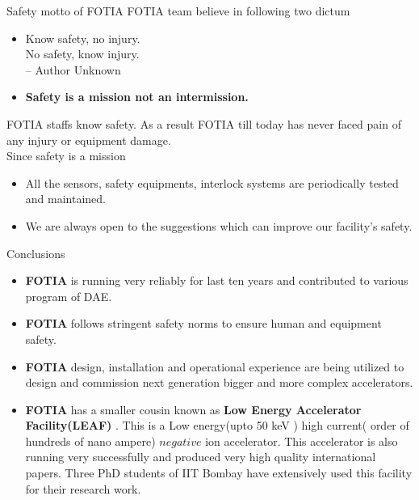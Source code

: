 \documentclass[11pt]{beamer}
\begin{document}
\begin{frame}{Safety motto of FOTIA}
FOTIA team believe in following two dictum
\begin{itemize}
\item Know safety, no injury.\\
     No safety, know injury. \\
      -- Author Unknown			
\item \textbf{Safety is a mission not an intermission.} 
\end{itemize} 

FOTIA staffs know safety. As a result FOTIA till today has never faced pain of any injury or equipment damage.\\
Since safety is a mission 
\begin{itemize}
\item 	All the sensors, safety equipments, interlock systems are periodically tested and maintained.
\item 	We are always open to the suggestions which can improve our facility's safety.	
 
\end{itemize} 

\end{frame}



\begin{frame}{Conclusions}
\begin{itemize}

\item \textbf{FOTIA} is running very reliably for last ten years and contributed to various program of DAE.

\item \textbf{FOTIA} follows stringent safety norms to ensure human and equipment safety.

\item \textbf{FOTIA} design, installation and operational experience are being utilized to design and commission next generation bigger and more complex accelerators.

\item \textbf{FOTIA} has a smaller cousin known as \textbf{Low Energy Accelerator Facility(LEAF)} . This is a Low energy(upto 50 keV ) high current( order of hundreds of nano ampere) $negative$ ion accelerator. This accelerator is also running very successfully and produced very high quality international papers. Three PhD students of IIT Bombay have extensively used this facility for their research work.



\end{itemize}
\end{frame}
\end{document}
